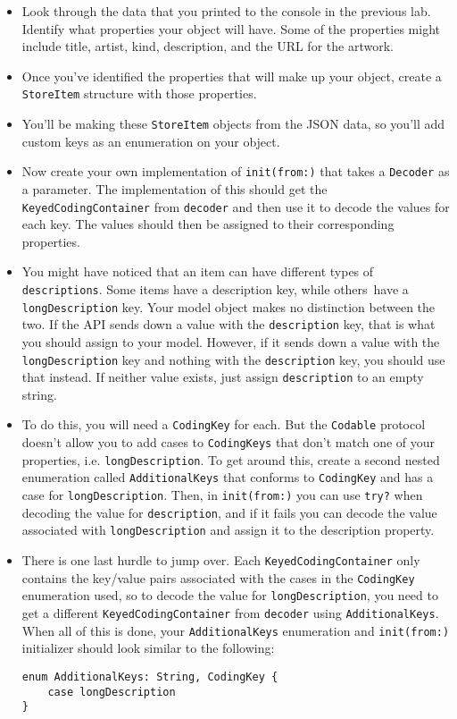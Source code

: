 \documentclass[a4paper,11pt]{scrartcl}
\begin{document}
\begin{itemize}
\item Look through the data that you printed to the console in the previous lab. Identify what properties your object will have. Some of the properties might include title, artist, kind, description, and the URL for the artwork.
\item Once you've identified the properties that will make up your object, create a \texttt{StoreItem} structure with those properties.
\item You'll be making these \texttt{StoreItem} objects from the JSON data, so you'll add custom keys as an enumeration on your object.
\item Now create your own implementation of \texttt{init(from:)} that takes a \texttt{Decoder} as a parameter. The implementation of this should get the \texttt{KeyedCodingContainer} from \texttt{decoder} and then use it to decode the values for each key. The values should then be assigned to their corresponding properties.
\item You might have noticed that an item can have different types of \texttt{descriptions}. Some items have a description key, while others have a \texttt{longDescription} key. Your model object makes no distinction between the two. If the API sends down a value with the \texttt{description} key, that is what you should assign to your model. However, if it sends down a value with the \texttt{longDescription} key and nothing with the \texttt{description} key, you should use that instead. If neither value exists, just assign \texttt{description} to an empty string. 
\item To do this, you will need a \texttt{CodingKey} for each. But the \texttt{Codable} protocol doesn't allow you to add cases to \texttt{CodingKeys} that don't match one of your properties, i.e. \texttt{longDescription}. To get around this, create a second nested enumeration called \texttt{AdditionalKeys} that conforms to \texttt{CodingKey} and has a case for \texttt{longDescription}. Then, in \texttt{init(from:)} you can use \texttt{try?} when decoding the value for \texttt{description}, and if it fails you can decode the value associated with \texttt{longDescription} and assign it to the description property.
\item There is one last hurdle to jump over. Each \texttt{KeyedCodingContainer} only contains the key/value pairs associated with the cases in the \texttt{CodingKey} enumeration used, so to decode the value for \texttt{longDescription}, you need to get a different \texttt{KeyedCodingContainer} from \texttt{decoder} using \texttt{AdditionalKeys}. When all of this is done, your \texttt{AdditionalKeys} enumeration and \texttt{init(from:)} initializer should look similar to the following:
\begin{lstlisting}
enum AdditionalKeys: String, CodingKey {
    case longDescription
}


\end{lstlisting}
\end{itemize}
\end{document}
